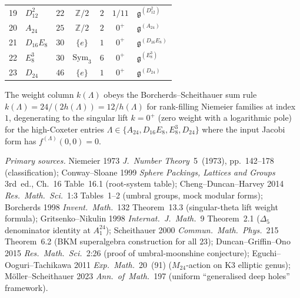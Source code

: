\begin{theorem}[The umbral BKM enumeration, \texorpdfstring{$A_1^{24}$}{A-1-24} entry \texorpdfstring{$=\Delta_5$}{=Delta-5}]
\begin{center}
\begin{tabular}{c|lccccl}
19 & $D_{12}^{2}$ & $22$ & $\mathbb Z/2$ & $2$ & $1/11$ & $\mathfrak g^{(D_{12}^{2})}$ \\
20 & $A_{24}$ & $25$ & $\mathbb Z/2$ & $2$ & $0^+$ & $\mathfrak g^{(A_{24})}$ \\
21 & $D_{16}E_8$ & $30$ & $\{e\}$ & $1$ & $0^+$ & $\mathfrak g^{(D_{16}E_8)}$ \\
22 & $E_8^{3}$ & $30$ & $\mathrm{Sym}_3$ & $6$ & $0^+$ & $\mathfrak g^{(E_8^{3})}$ \\
23 & $D_{24}$ & $46$ & $\{e\}$ & $1$ & $0^+$ & $\mathfrak g^{(D_{24})}$
\end{tabular}
\end{center}

The weight column $k(\Lambda)$ obeys the Borcherds--Scheithauer
sum rule $k(\Lambda)=24/(2h(\Lambda))=12/h(\Lambda)$ for
rank-filling Niemeier families at index~$1$, degenerating to the
singular lift $k=0^+$ (zero weight with a logarithmic pole) for
the high-Coxeter entries $\Lambda\in\{A_{24},D_{16}E_8,E_8^3,D_{24}\}$
where the input Jacobi form has $f^{(\Lambda)}(0,0)=0$.

\emph{Primary sources.}
Niemeier 1973 \emph{J.~Number Theory}~5~(1973), pp.~142--178
(classification);
Conway--Sloane 1999 \emph{Sphere Packings, Lattices and Groups}
3rd~ed., Ch.~16 Table~16.1 (root-system table);
Cheng--Duncan--Harvey 2014 \emph{Res.~Math.~Sci.}~1:3
Tables~1--2 (umbral groups, mock modular forms);
Borcherds 1998 \emph{Invent.~Math.}~132 Theorem~13.3
(singular-theta lift weight formula);
Gritsenko--Nikulin 1998 \emph{Internat.\ J.\ Math.}~9 Theorem~2.1
($\Delta_5$ denominator identity at $A_1^{24}$);
Scheithauer 2000 \emph{Commun.~Math.~Phys.}~215 Theorem~6.2
(BKM superalgebra construction for all $23$);
Duncan--Griffin--Ono 2015 \emph{Res.~Math.~Sci.}~2:26
(proof of umbral-moonshine conjecture);
Eguchi--Ooguri--Tachikawa 2011 \emph{Exp.~Math.}~20~(91)
($M_{24}$-action on K3 elliptic genus);
M\"oller--Scheithauer 2023 \emph{Ann.~of~Math.}~197
(uniform ``generalised deep holes'' framework).
\end{theorem}

